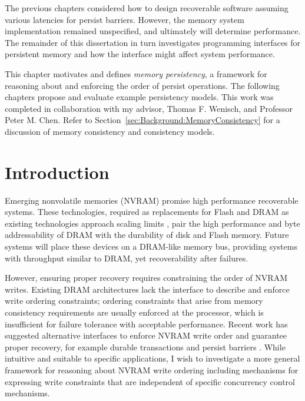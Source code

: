 The previous chapters considered how to design recoverable software assuming various latencies for persist barriers.
However, the memory system implementation remained unspecified, and ultimately will determine performance.
The remainder of this dissertation in turn investigates programming interfaces for persistent memory and how the interface might affect system performance.

This chapter motivates and defines \emph{memory persistency}, a framework for reasoning about and enforcing the order of persist operations.
The following chapters propose and evaluate example persistency models.
This work was completed in collaboration with my advisor, Thomas F. Wenisch, and Professor Peter M. Chen.
Refer to Section~\ref{sec:Background:MemoryConsistency} for a discussion of memory consistency and consistency models.

\section{Introduction}
\label{sec:Persistency:Intro}

Emerging nonvolatile memories (NVRAM) promise high performance recoverable systems.
These technologies, required as replacements for Flash and DRAM as existing technologies approach scaling limits \cite{LeeIpek09}, pair the high performance and byte addressability of DRAM with the durability of disk and Flash memory.
Future systems will place these devices on a DRAM-like memory bus, providing systems with throughput similar to DRAM, yet recoverability after failures.

However, ensuring proper recovery requires constraining the order of NVRAM writes.
Existing DRAM architectures lack the interface to describe and enforce write ordering constraints; ordering constraints that arise from memory consistency requirements are usually enforced at the processor, which is insufficient for failure tolerance with acceptable performance.
Recent work has suggested alternative interfaces to enforce NVRAM write order and guarantee proper recovery, for example durable transactions and persist barriers \cite{VolosTack11, ConditNightingale09}.
While intuitive and suitable to specific applications, I wish to investigate a more general framework for reasoning about NVRAM write ordering including mechanisms for expressing write constraints that are independent of specific concurrency control mechanisms.

